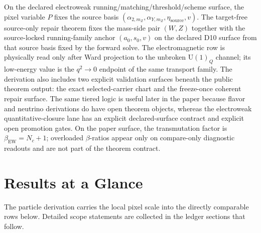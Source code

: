 \documentclass[11pt]{article}
\newcommand{\U}{\mathrm{U}}
\begin{document}
On the declared electroweak running/matching/threshold/scheme surface, the pixel variable \(P\) fixes the
source basis
\((\alpha_{2,m_Z},\alpha_{Y,m_Z},\eta_{\mathrm{source}},v)\). The target-free
source-only repair theorem fixes the mass-side pair \((W,Z)\) together with the source-locked
running-family anchor \((a_0,s_0,v)\) on the declared D10 surface from that source basis fixed by the forward solve. The
electromagnetic row is physically read only after Ward projection to the unbroken \(\U(1)_Q\)
channel; its low-energy value is the \(q^2\to0\) endpoint of the same transport family. The
derivation also includes two explicit validation surfaces beneath the public theorem output: the
exact selected-carrier chart and the freeze-once coherent repair surface. The same tiered logic is
useful later in the paper because flavor and neutrino derivations do have open theorem objects,
whereas the electroweak quantitative-closure lane has an explicit declared-surface contract and explicit open promotion gates.
On the paper surface, the transmutation factor is \(\beta_{\mathrm{EW}}=N_c+1\); overloaded \(\beta\)-ratios appear only on compare-only diagnostic readouts and are not part of the theorem contract.

\section{Results at a Glance}

The particle derivation carries the local pixel scale into the directly comparable rows below.
Detailed scope statements are collected in the ledger sections that follow.
\end{document}
